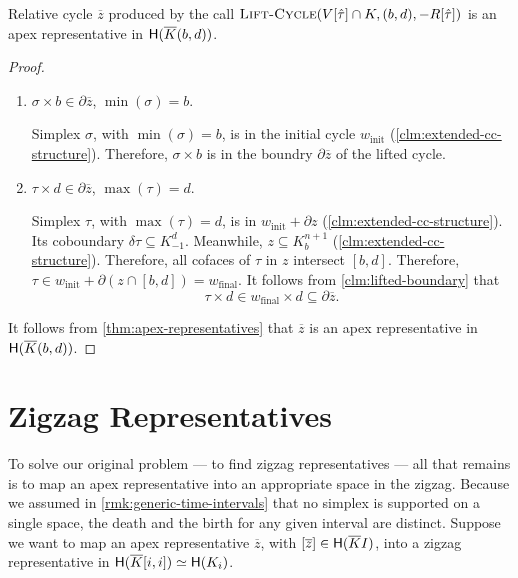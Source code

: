 \documentclass[cleveref,a4paper,english,nolineno]{socg-lipics-v2021}
\newcommand{\Hgr}{{\sf H}}
\newcommand{\prism}[1]{\overline{#1}}
\newcommand{\cone}[1]{\hat{#1}}
\newcommand{\bdry}{\partial}
\newcommand{\cbdry}{\delta}
\newcommand{\pK}{\prism{K}}
\newcommand{\pz}{\prism{z}}
\newcommand{\subK}[1]{K_{-1}^{#1}}
\newcommand{\supK}[1]{K_{#1}^{n+1}}
\newcommand{\ssx}{\sigma}
\newcommand{\tsx}{\tau}
\newcommand{\ctsx}{\cone{\tsx}}
\newcommand{\algname}[1]{\textsc{#1}}
\newcommand{\winit}{w_\textrm{init}}
\newcommand{\wfinal}{w_\textrm{final}}
\begin{document}
\begin{claim}%
    \label{clm:extended-cc-correct}
    Relative cycle $\pz$ produced by the call $\algname{Lift-Cycle}(V[\ctsx] \cap K, (b,d), -R[\ctsx])$
    is an apex representative in $\Hgr(\pK(b,d))$.
\end{claim}
\begin{proof}~

    \begin{enumerate}
        \item
            $\ssx \times b \in \bdry \pz$, $\min(\ssx) = b$.

            Simplex $\ssx$, with $\min(\ssx) = b$, is in the initial cycle $\winit$ (\cref{clm:extended-cc-structure}).
            Therefore, $\ssx \times b$ is in the boundry $\bdry \pz$ of the lifted cycle.

        \item
            $\tsx \times d \in \bdry \pz$, $\max(\tsx) = d$.

            Simplex $\tsx$, with $\max(\tsx) = d$, is in $\winit + \bdry z$ (\cref{clm:extended-cc-structure}).
            Its coboundary $\cbdry \tsx \subseteq \subK{d}$.
            Meanwhile, $z \subseteq \supK{b}$ (\cref{clm:extended-cc-structure}).
            Therefore, all cofaces of $\tsx$ in $z$ intersect $[b,d]$.
            Therefore, $\tsx \in \winit + \bdry \left( z \cap [b,d] \right) = \wfinal$.
            It follows from \cref{clm:lifted-boundary} that
            \[
                \tsx \times d \in \wfinal \times d \subseteq \bdry \pz.
            \]
    \end{enumerate}
    It follows from \cref{thm:apex-representatives} that $\pz$ is an apex
    representative in $\Hgr(\pK(b,d))$.
\end{proof}


\section{Zigzag Representatives}
\label{sec:zigzag-representatives}

To solve our original problem --- to find zigzag representatives --- all that
remains is to map an apex representative into an appropriate space in the
zigzag.
Because we assumed in \cref{rmk:generic-time-intervals} that no
simplex is supported on a single space, the death and the birth for any given
interval are distinct.
Suppose we want to map an apex representative $\pz$, with $[\pz] \in \Hgr(\pK I)$,
into a zigzag representative in
$\Hgr(\pK[i,i]) \simeq \Hgr(K_i)$.
\end{document}
